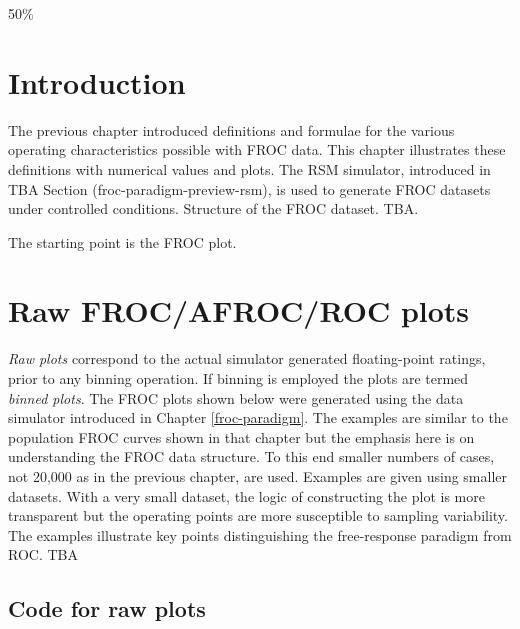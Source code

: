 \documentclass[
]{book}
\begin{document}
50\%

\hypertarget{froc-empirical-examples-intro}{%
\section{Introduction}\label{froc-empirical-examples-intro}}

The previous chapter introduced definitions and formulae for the various operating characteristics possible with FROC data. This chapter illustrates these definitions with numerical values and plots. The RSM simulator, introduced in TBA Section (froc-paradigm-preview-rsm), is used to generate FROC datasets under controlled conditions. Structure of the FROC dataset. TBA.

The starting point is the FROC plot.

\hypertarget{raw-frocafrocroc-plots}{%
\section{Raw FROC/AFROC/ROC plots}\label{raw-frocafrocroc-plots}}

\emph{Raw plots} correspond to the actual simulator generated floating-point ratings, prior to any binning operation. If binning is employed the plots are termed \emph{binned plots}. The FROC plots shown below were generated using the data simulator introduced in Chapter \ref{froc-paradigm}. The examples are similar to the population FROC curves shown in that chapter but the emphasis here is on understanding the FROC data structure. To this end smaller numbers of cases, not 20,000 as in the previous chapter, are used. Examples are given using smaller datasets. With a very small dataset, the logic of constructing the plot is more transparent but the operating points are more susceptible to sampling variability. The examples illustrate key points distinguishing the free-response paradigm from ROC. TBA

\hypertarget{froc-empirical-examples-raw-plots-code1}{%
\subsection{Code for raw plots}\label{froc-empirical-examples-raw-plots-code1}}
\end{document}
